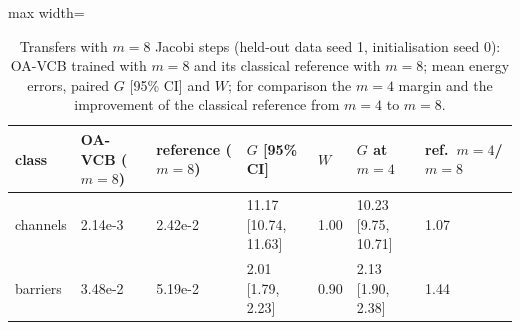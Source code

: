 \begin{table}[tbp]\centering\footnotesize\setlength{\tabcolsep}{4pt}
\caption{Transfers with $m=8$ Jacobi steps (held-out data seed 1, initialisation seed 0): OA-VCB trained with $m=8$ and its classical reference with $m=8$; mean energy errors, paired $G$ [95\% CI] and $W$; for comparison the $m=4$ margin and the improvement of the classical reference from $m=4$ to $m=8$.}\label{tab:m8}
\begin{adjustbox}{max width=\linewidth}
\begin{tabular}{lllllll}\toprule
class & OA-VCB ($m=8$) & reference ($m=8$) & $G$ [95\% CI] & $W$ & $G$ at $m=4$ & ref.\ $m=4$/$m=8$ \\\midrule
channels & 2.14e-3 & 2.42e-2 & 11.17 [10.74, 11.63] & 1.00 & 10.23 [9.75, 10.71] & 1.07 \\
barriers & 3.48e-2 & 5.19e-2 & 2.01 [1.79, 2.23] & 0.90 & 2.13 [1.90, 2.38] & 1.44 \\
\bottomrule\end{tabular}
\end{adjustbox}
\end{table}
